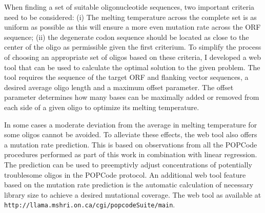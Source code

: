 When finding a set of suitable oligonucleotide sequences, two important criteria need to be considered: 
(i) The melting temperature across the complete set is as uniform as possible as this will ensure a more even mutation rate across the ORF sequence; (ii) the degenerate codon sequence should be located as close to the center of the oligo as permissible given the first criterium. To simplify the process of choosing an appropriate set of oligos based on these criteria, I developed a web tool that can be used to calculate the optimal solution to the given problem. The tool requires the sequence of the target ORF and flanking vector sequences, a desired average oligo length and a maximum offset parameter. The offset parameter determines how many bases can be maximally added or removed from each side of a given oligo to optimize its melting temperature. 

In some cases a moderate deviation from the average in melting temperature for some oligos cannot be avoided. To alleviate these effects, the web tool also offers a mutation rate prediction. This is based on observations from all the POPCode procedures performed as part of this work in combination with linear regression. The prediction can be used to preemptivly adjust concentrations of potentially troublesome oligos in the POPCode protocol. An additional web tool feature based on the mutation rate prediction is the automatic calculation of necessary library size to achieve a desired mutational coverage. The web tool as available at \verb|http://llama.mshri.on.ca/cgi/popcodeSuite/main|.



